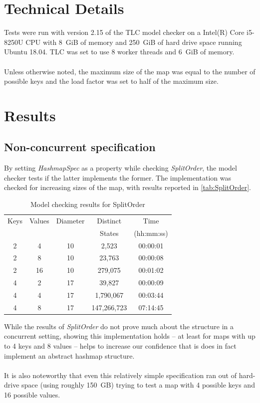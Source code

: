 \documentclass{uit-thesis}
\begin{document}
\section{Technical Details}
Tests were run with version 2.15 of the TLC model checker on a Intel(R) Core i5-8250U CPU with 8~GiB of memory and 250~GiB of hard drive space running Ubuntu 18.04. TLC was set to use 8 worker threads and 6~GiB of memory.
\\\\
Unless otherwise noted, the maximum size of the map was equal to the number of possible keys and the load factor was set to half of the maximum size.

\section{Results}
\subsection{Non-concurrent specification}
By setting \textit{HashmapSpec} as a property while checking \textit{SplitOrder}, the model checker tests if the latter implements the former. The implementation was checked for increasing sizes of the map, with results reported in \autoref{tab:SplitOrder}.
\begin{table}[h]
    \centering
    \begin{tabular}{ |c|c||c|c|c| }
        \hline
        Keys & Values & Diameter & Distinct & Time \\
        &        &          & States   & (hh:mm:ss)\\
        \hline
        2 & 4  & 10 & 2,523      & 00:00:01\\
        2 & 8  & 10 & 23,763     & 00:00:08\\
        2 & 16 & 10 & 279,075    & 00:01:02\\
        4 & 2  & 17 & 39,827     & 00:00:09\\
        4 & 4  & 17 & 1,790,067  & 00:03:44\\
        4 & 8  & 17 & 147,266,723& 07:14:45\\
        \hline
    \end{tabular}
    \caption{Model checking results for SplitOrder}
    \label{tab:SplitOrder}
\end{table}
While the results of \textit{SplitOrder} do not prove much about the structure in a concurrent setting, showing this implementation holds -- at least for maps with up to 4 keys and 8 values -- helps to increase our confidence that is does in fact implement an abstract hashmap structure.
\\\\
It is also noteworthy that even this relatively simple specification ran out of hard-drive space (using roughly 150~GB) trying to test a map with 4 possible keys and 16 possible values.
\end{document}
